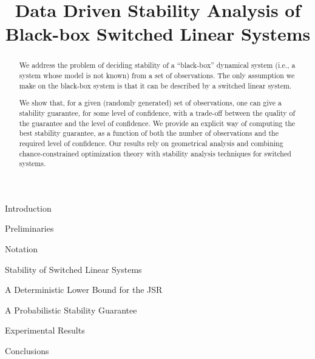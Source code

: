 \documentclass[letterpaper,11pt]{paper}
\title{Data Driven Stability Analysis of Black-box Switched Linear Systems}
\begin{document}
\maketitle

\begin{abstract}
We address the problem of deciding stability of a ``black-box'' dynamical system (i.e., a system whose model is not known) from a set of observations. The only assumption we make on the black-box system is that it can be described by a switched linear system. 

We show that, for a given (randomly generated) set of observations, one can give a stability guarantee, for some level of confidence, with a trade-off between the quality of the guarantee and the level of confidence. We provide an explicit way of computing the best stability guarantee, as a function of both the number of observations and the required level of confidence. Our results rely on geometrical analysis and combining chance-constrained optimization theory with stability analysis techniques for switched systems.
\end{abstract}

\begin{section}{Introduction}

\end{section}

\begin{section}{Preliminaries}
\label{sec:preliminaries}
\begin{subsection}{Notation}
 
\end{subsection}
\begin{subsection}{Stability of Switched Linear Systems}

\end{subsection}
\end{section}

\begin{section}{A Deterministic Lower Bound for the JSR}
\label{sec:lowerbound}

\end{section}

\begin{section}{A Probabilistic Stability Guarantee}
\label{sec:upperbound}



%
%
%
\end{section}

\begin{section}{Experimental Results}
\label{sec:experiments}

\end{section}

\begin{section}{Conclusions}
\label{sec:conclusions}

\end{section}

\appendix
\label{appendix}






\end{document}
